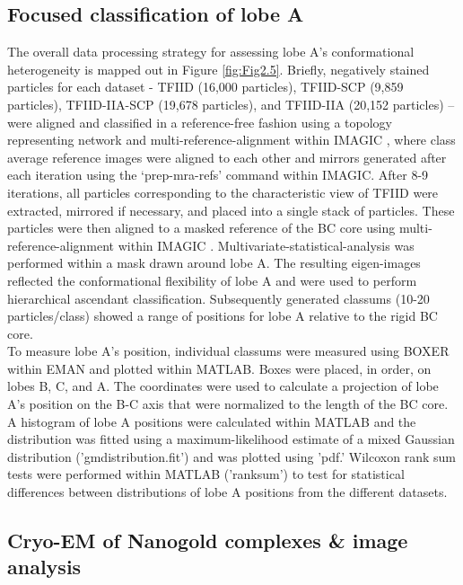 \subsection{Focused classification of lobe A}
The overall data processing strategy for assessing lobe A's conformational heterogeneity is mapped out in Figure \ref{fig:Fig2.5}.  Briefly, negatively stained particles for each dataset - TFIID (16,000 particles), TFIID-SCP (9,859 particles), TFIID-IIA-SCP (19,678 particles), and TFIID-IIA (20,152 particles) – were aligned and classified in a reference-free fashion using a topology representing network \cite{Ogura_1656} and multi-reference-alignment within IMAGIC \cite{va_2849}, where class average reference images were aligned to each other and mirrors generated after each iteration using the ‘prep-mra-refs’ command within IMAGIC.  After 8-9 iterations, all particles corresponding to the characteristic view of TFIID were extracted, mirrored if necessary, and placed into a single stack of particles.  These particles were then aligned to a masked reference of the BC core using multi-reference-alignment within IMAGIC \cite{va_2849}.  Multivariate-statistical-analysis was performed within a mask drawn around lobe A.  The resulting eigen-images reflected the conformational flexibility of lobe A and were used to perform hierarchical ascendant classification.  Subsequently generated classums (10-20 particles/class) showed a range of positions for lobe A relative to the rigid BC core.\\
\indent To measure lobe A's position, individual classums were measured using BOXER within EMAN \cite{Ludtke_2307} and plotted within MATLAB. Boxes were placed, in order, on lobes B, C, and A.  The coordinates were used to calculate a projection of lobe A's position on the B-C axis that were normalized to the length of the BC core.  A histogram of lobe A positions were calculated within MATLAB and the distribution was fitted using a maximum-likelihood estimate of a mixed Gaussian distribution ('gmdistribution.fit') and was plotted using 'pdf.' Wilcoxon rank sum tests were performed within MATLAB ('ranksum') to test for statistical differences between distributions of lobe A positions from the different datasets.\\

\subsection{Cryo-EM of Nanogold complexes \& image analysis}
 
